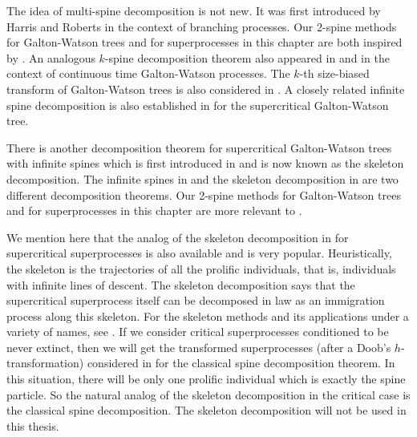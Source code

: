 \documentclass[UTF8]{pkuthss}
\theoremstyle{plain}
\theoremstyle{definition}
\numberwithin{equation}{section}
\begin{document}
	The idea of multi-spine decomposition is not new. It was first introduced by Harris and Roberts \cite{HarrisRoberts2017The-many-to-few} in the context of branching processes.
Our 2-spine methods for Galton-Watson trees \cite{RenSongSun2018A-2-spine} and for superprocesses in this chapter are both inspired by \cite{HarrisRoberts2017The-many-to-few}.
	An analogous $k$-spine decomposition theorem also appeared in \cite{HarrisJohnstonRoberts2017The-coalescent} and \cite{Johnston2017Coalescence} in the context of continuous time Galton-Watson processes.
	The $k$-th size-biased transform of Galton-Watson trees is also considered in \cite{AbrahamDebs2018Penalization}.
	A closely related infinite spine decomposition is also established in \cite{AbrahamDebs2018Penalization} for the supercritical Galton-Watson tree.
	
	There is another decomposition theorem for supercritical Galton-Watson trees with infinite spines which is first introduced in \cite[Section 12]{AthreyaNey1972Branching} and is now known as the skeleton decomposition.
	The infinite spines in \cite{AbrahamDebs2018Penalization} and the skeleton decomposition 
	in \cite[Section 12]{AthreyaNey1972Branching} are two different decomposition theorems.
	Our 2-spine methods for Galton-Watson trees \cite{RenSongSun2018A-2-spine} and for
    superprocesses in this chapter are more relevant to \cite{AbrahamDebs2018Penalization}.



	We mention here that the analog of the skeleton decomposition in \cite[Section 12]{AthreyaNey1972Branching} for supercritical superprocesses is also available and is very popular.
	Heuristically, the skeleton is the trajectories of all the prolific individuals, that is, individuals with infinite lines of descent.
	The skeleton decomposition says that the supercritical superprocess itself can be decomposed in law as an immigration process along this skeleton.
	For the skeleton methods and its applications under a variety of names, see \cite{BerestyckiKyprianouMurillo-Salas2011The-prolific,  BertoinFontbonaMartinez2008On-prolific, DuquesneWinkel2007Growth, EckhoffKyprianouWinkel2015Spines, EnglanderPinsky1999On-the-construction, EvansOConnell1994Weighted,  KyprianouPerezRen2014The-backbone, KyprianouRen2012Backbone,  Milos2018Spatial,  RenSongZhang2014Central}.
	If we consider critical superprocesses conditioned to be never extinct,
	then we will get the transformed superprocesses (after a Doob's $h$-transformation) considered in \cite{EckhoffKyprianouWinkel2015Spines, EnglanderKyprianou2004Local, LiuRenSong2009LlogL} for the classical spine decomposition theorem. In this situation, there will be only one prolific individual which is exactly the spine particle.
	So the natural analog of the skeleton decomposition in the critical case is the classical spine decomposition.
	The skeleton decomposition will not be used in this thesis.
\end{document}
